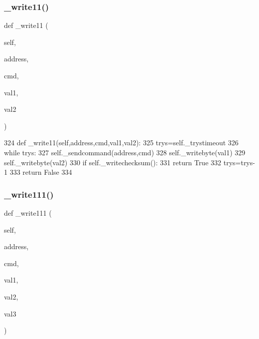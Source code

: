 \subsubsection{\texorpdfstring{\+\_\+write11()}{\_write11()}}
{\footnotesize\ttfamily def \+\_\+write11 (\begin{DoxyParamCaption}\item[{}]{self,  }\item[{}]{address,  }\item[{}]{cmd,  }\item[{}]{val1,  }\item[{}]{val2 }\end{DoxyParamCaption})\hspace{0.3cm}{\ttfamily [private]}}


\begin{DoxyCode}
324     \textcolor{keyword}{def }\_write11(self,address,cmd,val1,val2):
325         trys=self.\_trystimeout
326         \textcolor{keywordflow}{while} trys:
327             self.\_sendcommand(address,cmd)
328             self.\_writebyte(val1)
329             self.\_writebyte(val2)
330             \textcolor{keywordflow}{if} self.\_writechecksum():
331                 \textcolor{keywordflow}{return} \textcolor{keyword}{True}
332             trys=trys-1
333         \textcolor{keywordflow}{return} \textcolor{keyword}{False}
334 
\end{DoxyCode}
\mbox{\label{classtoxic__hardware_1_1roboclaw__3_1_1Roboclaw_ac0745e9d0910b3a66157a45cf3142dee}} 
\subsubsection{\texorpdfstring{\+\_\+write111()}{\_write111()}}
{\footnotesize\ttfamily def \+\_\+write111 (\begin{DoxyParamCaption}\item[{}]{self,  }\item[{}]{address,  }\item[{}]{cmd,  }\item[{}]{val1,  }\item[{}]{val2,  }\item[{}]{val3 }\end{DoxyParamCaption})\hspace{0.3cm}{\ttfamily [private]}}


